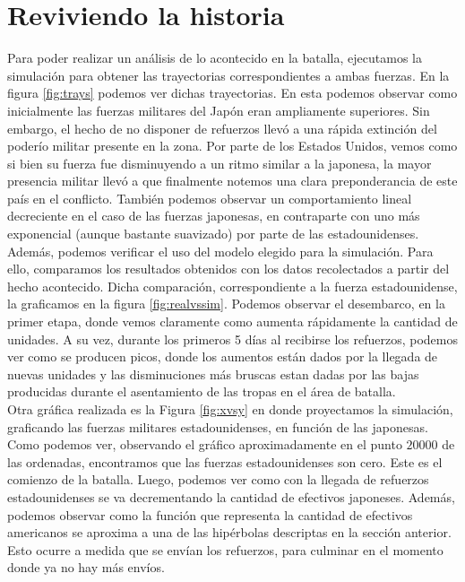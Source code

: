 \documentclass{sig-alternate}
\begin{document}
\section{Reviviendo la historia}
\label{sec:reviving}
Para poder realizar un análisis de lo acontecido en la batalla, ejecutamos la simulación para obtener las 
trayectorias correspondientes a ambas fuerzas. En la figura \ref{fig:trays} podemos ver dichas trayectorias. 
En esta podemos observar como inicialmente las fuerzas militares del Japón eran ampliamente superiores. Sin embargo, el hecho de no disponer de 
refuerzos llevó a una rápida extinción del poderío militar presente en la zona. Por parte de los 
Estados Unidos, vemos como si bien su fuerza fue disminuyendo a un ritmo similar a la japonesa, la mayor presencia militar llevó a que finalmente
notemos una clara preponderancia de este país en el conflicto. También podemos observar un comportamiento lineal decreciente en el caso de las fuerzas japonesas,
en contraparte con uno más exponencial (aunque bastante suavizado) por parte de las estadounidenses.\\
Además, podemos verificar el uso del modelo elegido para la simulación. Para ello, comparamos los resultados obtenidos con los datos 
recolectados a partir del hecho acontecido. Dicha comparación, correspondiente a la fuerza estadounidense, la graficamos en la figura 
\ref{fig:realvssim}.
Podemos observar el desembarco, en la primer etapa, donde vemos claramente como aumenta rápidamente la cantidad de unidades. 
A su vez, durante los primeros 5 días al recibirse los refuerzos, podemos ver como se producen picos, 
donde los aumentos están dados por la llegada de nuevas unidades y las disminuciones más bruscas estan dadas 
por las bajas producidas durante el asentamiento de las tropas en el área de batalla.\\
Otra gráfica realizada es la Figura \ref{fig:xvsy} en donde proyectamos la simulación, graficando las fuerzas militares
estadounidenses, en función de las japonesas. Como podemos ver, observando el gráfico aproximadamente en el punto $20000$ de las ordenadas,
encontramos que las fuerzas estadounidenses son cero. Este es el comienzo de la batalla. Luego, podemos ver como con la llegada de refuerzos 
estadounidenses se va decrementando la cantidad de efectivos japoneses. Además, podemos observar como la función que representa la cantidad de
efectivos americanos se aproxima a una de las hipérbolas descriptas en la sección anterior. Esto ocurre a medida que se envían los refuerzos,
para culminar en el momento donde ya no hay más envíos. 
\end{document}
